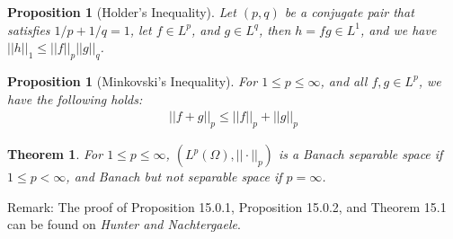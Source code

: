 \documentclass[11pt]{book}
\theoremstyle{break}
\theoremstyle{break}
\newtheorem{thm}{Theorem}[section]
\newtheorem{prop}[lem]{Proposition}
\newcommand{\remark}{\color{blue}Remark: \color{black}}
\begin{document}
\begin{prop}[Holder's Inequality]
Let $(p,q)$ be a conjugate pair that satisfies $1/p + 1/q = 1$, let $f \in L^p$, and $g \in L^q$, then $h = fg \in L^1$, and we have $||h||_1 \leq ||f||_p ||g||_q$. 
\end{prop}

\begin{prop}[Minkovski's Inequality]
For $1\leq p \leq \infty$, and all $f,g \in L^p$, we have the following holds:
\begin{align*}
||f+ g||_p \leq ||f||_p + ||g||_p
\end{align*}
\end{prop}

\begin{thm}
For $1 \leq p \leq \infty$, $(L^p(\Omega) , ||\cdot ||_p)$ is a Banach separable space if $1 \leq p < \infty$, and Banach but not separable space if $p = \infty$. 
\end{thm}

\remark The proof of Proposition 15.0.1, Proposition 15.0.2, and Theorem 15.1 can be found on \textit{Hunter and Nachtergaele}.
\end{document}
